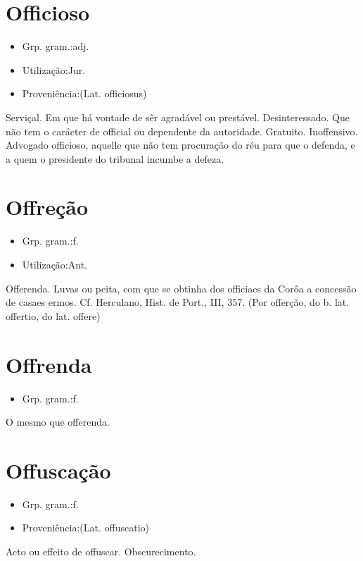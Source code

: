 \section{Officioso}
\begin{itemize}
\item {Grp. gram.:adj.}
\end{itemize}
\begin{itemize}
\item {Utilização:Jur.}
\end{itemize}
\begin{itemize}
\item {Proveniência:(Lat. \textunderscore officiosus\textunderscore )}
\end{itemize}
Serviçal.
Em que há vontade de sêr agradável ou prestável.
Desinteressado.
Que não tem o carácter de official ou dependente da autoridade.
Gratuito.
Inoffensivo.
Advogado \textunderscore officioso\textunderscore , aquelle que não tem procuração do réu para que o defenda, e a quem o presidente do tribunal incumbe a defeza.
\section{Offreção}
\begin{itemize}
\item {Grp. gram.:f.}
\end{itemize}
\begin{itemize}
\item {Utilização:Ant.}
\end{itemize}
Offerenda.
Luvas ou peita, com que se obtinha dos officiaes da Corôa a concessão de casaes ermos. Cf. Herculano, \textunderscore Hist. de Port.\textunderscore , III, 357.
(Por \textunderscore offerção\textunderscore , do b. lat. \textunderscore offertio\textunderscore , do lat. \textunderscore offere\textunderscore )
\section{Offrenda}
\begin{itemize}
\item {Grp. gram.:f.}
\end{itemize}
O mesmo que \textunderscore offerenda\textunderscore .
\section{Offuscação}
\begin{itemize}
\item {Grp. gram.:f.}
\end{itemize}
\begin{itemize}
\item {Proveniência:(Lat. \textunderscore offuscatio\textunderscore )}
\end{itemize}
Acto ou effeito de offuscar.
Obscurecimento.
